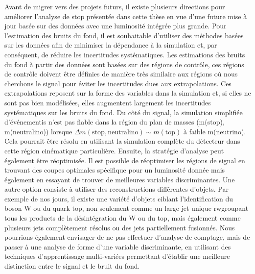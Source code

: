 Avant de migrer vers des projets futurs, il existe plusieurs directions pour améliorer l'analyse de stop présentée dans cette thèse en vue d'une future mise à jour basée sur des données avec une luminosité intégrée plus grande. Pour l'estimation des bruits du fond, il est souhaitable d'utiliser des méthodes basées sur les données afin de minimiser la dépendance à la simulation et, par conséquent, de réduire les incertitudes systématiques. Les estimations des bruits du fond  à partir des  données sont basées sur des régions de contrôle, ces régions de contrôle doivent être définies de manière très similaire aux régions où nous cherchons le signal pour éviter les incertitudes dues aux extrapolations. Ces extrapolations reposent sur la forme des variables dans la simulation et, si elles ne sont pas bien modélisées, elles augmentent largement les incertitudes systématiques sur les bruits du fond. Du côté du signal, la simulation simplifiée d'événementis n'est pas fiable dans la région du plan de masses  (m(stop), m(neutralino)) lorsque  $ \Delta m (\mathrm{stop, neutralino}) \sim m(\mathrm{top}) $ à faible m(neutrino). Cela pourrait être résolu en utilisant la simulation complète du détecteur dans cette région cinématique particulière. Ensuite, la stratégie d'analyse peut également être réoptimisée. Il est possible de réoptimiser les régions de signal en trouvant des coupes optimales spécifique pour un luminosité donnée mais également en essayant  de trouver de meilleures variables discriminantes. Une autre option consiste à utiliser des reconstructions différentes d'objets. Par exemple de nos jours, il existe une variété d'objets ciblant l'identification du boson W ou du quark top, non seulement comme un large jet unique rwgroupant tous les products de la désintégration du W ou du top, mais également comme plusieurs jets complètement résolus ou des jets partiellement fusionnés. Nous pourrions également envisager de ne pas effectuer d’analyse de comptage, mais de passer à une analyse de forme d'une variable discriminante, en utilisant des techniques d’apprentissage multi-variées permettant d’établir une meilleure distinction entre le signal et le bruit du fond.


